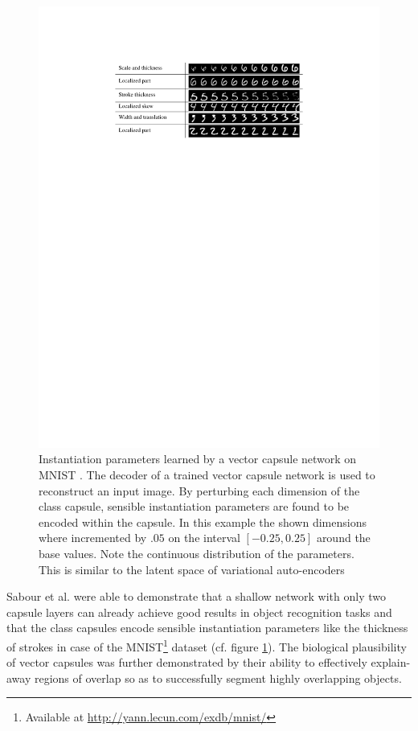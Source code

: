 \begin{figure}[H]
    \centering
    \includegraphics[width=.90\textwidth]{figures/vector-capsules-parameters.pdf}
\caption[Instantiation parameters learned by a vector capsule network on MNIST]{Instantiation parameters learned by a vector capsule network on MNIST \cite{sabour2017dynamic}. The decoder of a trained vector capsule network is used to reconstruct an input image. By perturbing each dimension of the class capsule, sensible instantiation parameters are found to be encoded within the capsule. In this example the shown dimensions where incremented by $\num{.05}$ on the interval $[\num{-0.25}, \num{0.25}]$ around the base values. Note the continuous distribution of the parameters. This is similar to the latent space of variational auto-encoders \cite{kingma2013auto} }\label{fig:vector-capsules-parameters}
\end{figure}\noindent
Sabour et al. were able to demonstrate that a shallow network with only two capsule layers can already achieve good results in object recognition tasks and that the class capsules encode sensible instantiation parameters like the thickness of strokes in case of the MNIST\footnote{Available at \url{http://yann.lecun.com/exdb/mnist/}} dataset (cf. figure \ref{fig:vector-capsules-parameters}). The biological plausibility of vector capsules was further demonstrated by their ability to effectively explain-away regions of overlap so as to successfully segment highly overlapping objects.
